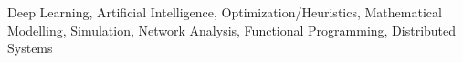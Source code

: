 \small{Deep Learning, Artificial Intelligence, Optimization/Heuristics,
Mathematical Modelling, Simulation, Network Analysis, Functional
Programming, Distributed Systems}